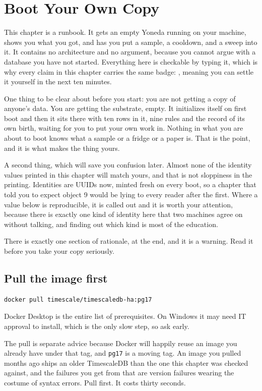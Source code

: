 \chapter{Boot Your Own Copy}

This chapter is a runbook. It gets an empty Yoneda running on your machine, shows you what you got, and has you put a sample, a cooldown, and a sweep into it. It contains no architecture and no argument, because you cannot argue with a database you have not started. Everything here is checkable by typing it, which is why every claim in this chapter carries the same badge: , meaning you can settle it yourself in the next ten minutes.

One thing to be clear about before you start: you are not getting a copy of anyone's data. You are getting the substrate, empty. It initializes itself on first boot and then it sits there with ten rows in it, nine rules and the record of its own birth, waiting for you to put your own work in. Nothing in what you are about to boot knows what a sample or a fridge or a paper is. That is the point, and it is what makes the thing yours.

A second thing, which will save you confusion later. Almost none of the identity values printed in this chapter will match yours, and that is not sloppiness in the printing. Identities are UUIDs now, minted fresh on every boot, so a chapter that told you to expect object 9 would be lying to every reader after the first. Where a value below is reproducible, it is called out and it is worth your attention, because there is exactly one kind of identity here that two machines agree on without talking, and finding out which kind is most of the education.

There is exactly one section of rationale, at the end, and it is a warning. Read it before you take your copy seriously.

\section{Pull the image first}

\begin{verbatim}
docker pull timescale/timescaledb-ha:pg17
\end{verbatim}

Docker Desktop is the entire list of prerequisites. On Windows it may need IT approval to install, which is the only slow step, so ask early.

The pull is separate advice because Docker will happily reuse an image you already have under that tag, and \verb|pg17| is a moving tag. An image you pulled months ago ships an older TimescaleDB than the one this chapter was checked against, and the failures you get from that are version failures wearing the costume of syntax errors. Pull first. It costs thirty seconds.

